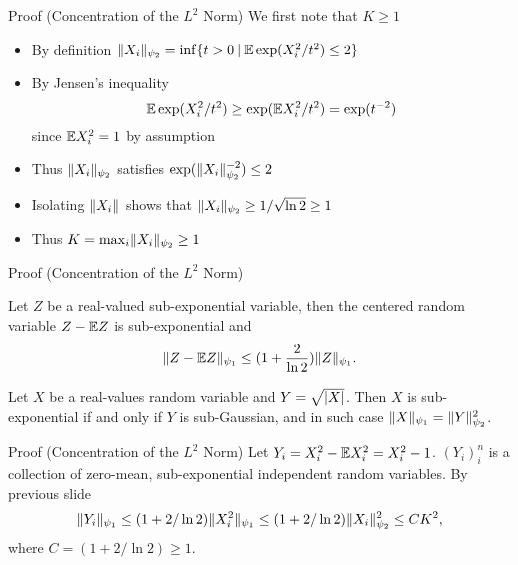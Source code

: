 \documentclass{beamer}
\begin{document}
  \begin{frame}{Proof (Concentration of the \(L^{2}\) Norm)}
    We first note that \(K \geq 1\)\pause
    \begin{itemize}
      \item By definition
        \(\lVert X_{i}\rVert_{\psi_{2}} = \inf\{t > 0 \: | \: \mathbb{E}\exp(X_{i}^{2} / t^{2}) \leq 2\}\)\pause
      \item
        By Jensen's inequality
        \begin{equation}
          \mathbb{E} \exp(X_{i}^{2} / t^{2}) \geq \exp(\mathbb{E} X_{i}^{2} / t^{2}) = \exp(t^{-2})
        \end{equation}
        since \(\mathbb{E} X_{i}^{2} = 1\) by assumption\pause
      \item Thus \(\lVert X_{i}\rVert_{\psi_{2}}\) satisfies
        \(\exp(\lVert X_{i}\rVert_{\psi_{2}}^{-2}) \leq 2\) \pause
      \item Isolating \(\lVert X_{i}\rVert_{}\) shows that
        \(\lVert X_{i}\rVert_{\psi_{2}} \geq 1 / \sqrt{\ln 2} \geq 1\)\pause
      \item Thus \(K = \max_{i}\lVert X_{i}\rVert_{\psi_{2}} \geq 1\)
    \end{itemize}
  \end{frame}

  \begin{frame}{Proof (Concentration of the \(L^{2}\) Norm)}
    \begin{proposition}
      \label{prop:centering-of-sub-exp-rvs}
      Let \(Z\) be a real-valued sub-exponential variable, then the centered random
      variable \(Z - \mathbb{E} Z\) is sub-exponential and
      \begin{equation}
        \lVert Z - \mathbb{E} Z\rVert_{\psi_{1}} \leq (1 + \frac{2}{\ln 2}) \lVert Z\rVert_{\psi_{1}}.
      \end{equation}
    \end{proposition}
    
    \begin{proposition}
      \label{prop:sub-gauss-sub-exp-norm-relation}
      Let \(X\) be a real-values random variable and \(Y = \sqrt{\lvert X\rvert}\). Then
      \(X\) is sub-exponential if and only if \(Y\) is sub-Gaussian, and in such
      case \(\lVert X\rVert_{\psi_{1}} = \lVert Y\rVert_{\psi_{2}}^{2}\).
    \end{proposition}
  \end{frame}

  \begin{frame}{Proof (Concentration of the \(L^{2}\) Norm)}
    Let \(Y_{i} = X_{i}^{2} - \mathbb{E} X_{i}^{2} = X_{i}^{2} - 1\). \pause
    \((Y_{i})_{i}^{n}\) is a collection of
    zero-mean, sub-exponential independent random variables. \pause By previous
    slide
    \begin{equation}
      \lVert Y_{i}\rVert_{\psi_{1}} \leq (1 + 2 / \ln 2)\lVert X_{i}^{2}\rVert_{\psi_{1}} \leq (1 + 2 / \ln 2)\lVert X_{i}\rVert_{\psi_{2}}^{2} \leq C K^{2},
    \end{equation}
    where \(C = (1 + 2 / \ln 2) \geq 1\).
  \end{frame}
\end{document}
